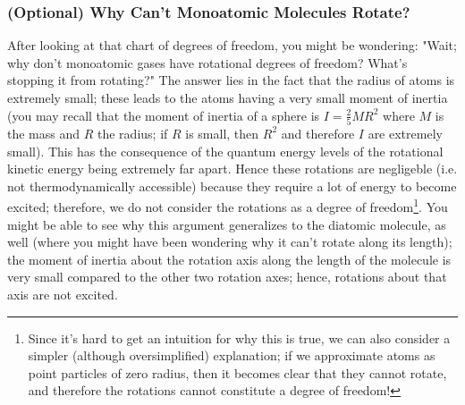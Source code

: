 \subsubsection{(Optional) Why Can't Monoatomic Molecules Rotate?}
After looking at that chart of degrees of freedom, you might be wondering: "Wait; why don't monoatomic gases have rotational degrees of freedom? What's stopping it from rotating?" The answer lies in the fact that the radius of atoms is extremely small; these leads to the atoms having a very small moment of inertia (you may recall that the moment of inertia of a sphere is $I = \frac{2}{5}MR^2$ where $M$ is the mass and $R$ the radius; if $R$ is small, then $R^2$ and therefore $I$ are extremely small). This has the consequence of the quantum energy levels of the rotational kinetic energy being extremely far apart. Hence these rotations are negligeble (i.e. not thermodynamically accessible) because they require a lot of energy to become excited; therefore, we do not consider the rotations as a degree of freedom\footnote{Since it's hard to get an intuition for why this is true, we can also consider a simpler (although oversimplified) explanation; if we approximate atoms as point particles of zero radius, then it becomes clear that they cannot rotate, and therefore the rotations cannot constitute a degree of freedom!}. You might be able to see why this argument generalizes to the diatomic molecule, as well (where you might have been wondering why it can't rotate along its length); the moment of inertia about the rotation axis along the length of the molecule is very small compared to the other two rotation axes; hence, rotations about that axis are not excited. 


